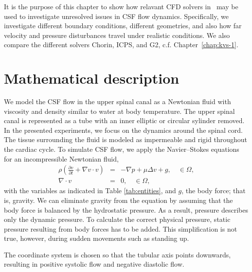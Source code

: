 It is the purpose of this
chapter to 
show how relavant CFD solvers in \fenics\ may be used to investigate unresolved issues in CSF flow dynamics. 
Specifically, we investigate
different boundary conditions, different geometries, and also how far velocity and pressure disturbances travel
under realistic conditions. We also compare the different solvers Chorin,
ICPS, and G2, c.f. Chapter~\ref{chap:kvs-1}.

\section{Mathematical description}

We model the CSF flow in the upper spinal canal as a Newtonian fluid
 with viscosity and density similar to water
at body temperature. The upper spinal canal is represented as a tube 
with an inner elliptic or circular sylinder removed.  
In the presented experiments, we focus on the
dynamics around the spinal cord. The tissue surrounding the fluid is
modeled as impermeable and rigid throughout the cardiac cycle. To
simulate CSF flow, we apply the Navier--Stokes 
equations for an incompressible Newtonian fluid,
\begin{eqnarray}
\rho \left(\frac{\partial v}{\partial t} + \nabla v \cdot v \right) &=& -\nabla p + \mu \Delta v + g, \quad \in \Omega, \\
\nabla \cdot v &=& 0, \quad \in \Omega,
\end{eqnarray}
with the variables as indicated in Table \ref{tab:entities}, and $g$,
the body force; that is, gravity. We can eliminate gravity from the
equation by assuming that the body force is balanced by the
hydrostatic pressure. As a result, pressure describes only the dynamic
pressure. To calculate the correct physical pressure, static
pressure resulting from body forces has to be added. This
simplification is not true, however, during sudden movements such as
standing up.

The coordinate system is chosen so that the tubular axis points downwards, resulting in positive systolic flow and negative diastolic flow.

